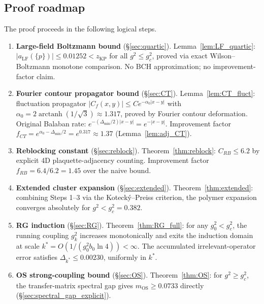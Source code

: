 \documentclass[11pt,a4paper]{amsart}
\theoremstyle{definition}
\newcommand{\Del}{\Delta_{\min}}
\newcommand{\Cf}{C_f}
\newcommand{\zKP}{z_{\mathrm{KP}}}
\begin{document}
\subsection{Proof roadmap}
\label{sec:roadmap}

The proof proceeds in the following logical steps.

\begin{enumerate}[label=\textbf{Step \arabic*.}]
\item \textbf{Large-field Boltzmann bound} (§\ref{sec:quartic}).
      Lemma~\ref{lem:LF_quartic}: $|a_{\mathrm{LF}}(\{p\})| \le 0.01252 < \zKP$
      for all $g^2 \le g^2_c$, proved via exact Wilson--Boltzmann monotone
      comparison.  No BCH approximation; no improvement-factor claim.

\item \textbf{Fourier contour propagator bound} (§\ref{sec:CT}).
      Lemma~\ref{lem:CT_fluct}: fluctuation propagator $|\Cf(x,y)| \le C e^{-\alpha_0|x-y|}$
      with $\alpha_0 = 2\operatorname{arctanh}(1/\sqrt{3}) \approx 1.317$, proved by
      Fourier contour deformation.  Original Balaban rate: $e^{-(\Del/2)|x-y|}=e^{-|x-y|}$.
      Improvement factor $f_{CT} = e^{\alpha_0 - \Del/2} = e^{0.317} \approx 1.37$
      (Lemma~\ref{lem:adj_CT}).

\item \textbf{Reblocking constant} (§\ref{sec:reblock}).
      Theorem~\ref{thm:reblock}: $C_{RB} \le 6.2$ by explicit 4D
      plaquette-adjacency counting.  Improvement factor $f_{RB} = 6.4/6.2 = 1.45$
      over the naive bound.

\item \textbf{Extended cluster expansion} (§\ref{sec:extended}).
      Theorem~\ref{thm:extended}: combining Steps 1--3 via the
      Koteck\'y--Preiss criterion, the polymer expansion converges absolutely for
      $g^2 < g^2_c = 0.382$.

\item \textbf{RG induction} (§\ref{sec:RG}).
      Theorem~\ref{thm:RG_full}: for any $g^2_0 < g^2_c$, the running coupling
      $g^2_k$ increases monotonically and exits the induction domain at
      scale $k^* = O(1/(g^2_0 b_0 \ln 4)) < \infty$.  The accumulated
      irrelevant-operator error satisfies $\Delta_{k^*} \le 0.00230$,
      uniformly in $k^*$.

\item \textbf{OS strong-coupling bound} (§\ref{sec:OS}).
      Theorem~\ref{thm:OS}: for $g^2 \ge g^2_c$, the transfer-matrix
      spectral gap gives $m_{\mathrm{OS}} \ge 0.0733$ directly
      (§\ref{sec:spectral_gap_explicit}).


\end{enumerate}
\end{document}
